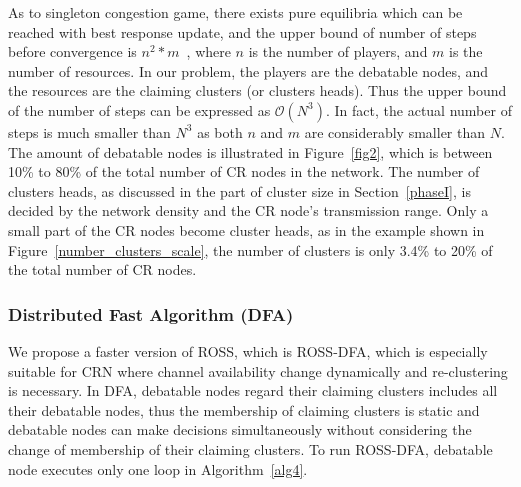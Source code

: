 \documentclass[10pt,journal,compsoc]{IEEEtran}
\theoremstyle{mytheoremstyle}
\theoremstyle{mytheoremstyle}
\theoremstyle{mytheoremstyle}
\begin{document}
As to singleton congestion game, there exists pure equilibria which can be reached with best response update, and the upper bound of number of steps before convergence is $n^2*m$~\cite{Ackermann06purenash}, where $n$ is the number of players, and $m$ is the number of resources.
In our problem, the players are the debatable nodes, and the resources are the claiming clusters (or clusters heads).
Thus the upper bound of the number of steps can be expressed as $\mathcal{O}(N^3)$.
In fact, the actual number of steps is much smaller than $N^3$ as both $n$ and $m$ are considerably smaller than $N$.
The amount of debatable nodes is illustrated in Figure~\ref{fig2}, which is between 10\% to 80\% of the total number of CR nodes in the network.
The number of clusters heads, as discussed in the part of cluster size in Section~\ref{phaseI}, is decided by the network density and the CR node's transmission range.
Only a small part of the CR nodes become cluster heads, as in the example shown in Figure~\ref{number_clusters_scale}, the number of clusters is only 3.4\% to 20\% of the total number of CR nodes.




\subsubsection{Distributed Fast Algorithm (DFA)}
We propose a faster version of ROSS, which is ROSS-DFA, which is especially suitable for CRN where channel availability change dynamically and re-clustering is necessary.
In DFA, debatable nodes regard their claiming clusters includes all their debatable nodes, thus the membership of claiming clusters is static and debatable nodes can make decisions simultaneously without considering the change of membership of their claiming clusters.
To run ROSS-DFA, debatable node executes only one loop in Algorithm~\ref{alg4}.
\end{document}
